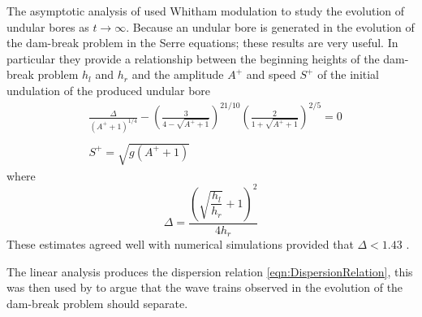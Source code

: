The asymptotic analysis of \citet{El-etal-2006} used Whitham modulation to study the evolution of undular bores as $t\rightarrow \infty$. Because an undular bore is generated in the evolution of the dam-break problem in the Serre equations; these results are very useful. In particular they provide a relationship between the beginning heights of the dam-break problem $h_l$ and $h_r$ and the amplitude $A^+$ and speed $S^+$ of the initial undulation of the produced undular bore  
\begin{subequations}
	\begin{align}
	&\frac{\Delta}{\left(A^+ + 1\right)^{1/4}} - \left(\frac{3}{4 -  \sqrt{A^+ + 1}}\right)^{21/10} \left(\frac{2}{1 + \sqrt{A^+ + 1}}\right)^{2/5} = 0	\label{eqn:Aplusdef} \\  \nonumber \\
	&S^+ = \sqrt{g \left(A^+ + 1\right)}	\label{eqn:Splusdef}
	\end{align}
	\label{eqn:ELWhitMod}	
\end{subequations}
where
\begin{equation}
\Delta = \frac{\left(\sqrt{\dfrac{h_l}{h_r}} + 1\right)^2}{4 h_r}
\end{equation}
These estimates agreed well with numerical simulations provided that $\Delta < 1.43$ \cite{El-etal-2006}.

The linear analysis produces the dispersion relation \eqref{eqn:DispersionRelation}, this was then used by \citet{Dougalis-etal-2007} to argue that the wave trains observed in the evolution of the dam-break problem should separate. 


